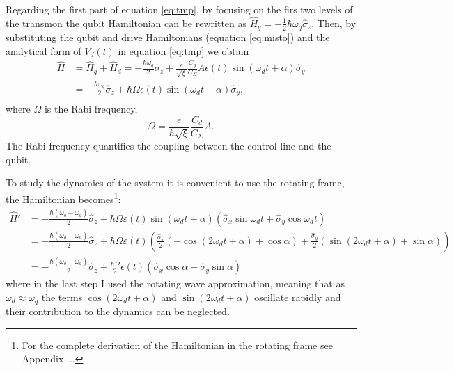 Regarding the first part of equation \ref{eq:tmp}, by focusing on the firs two levels of the transmon the qubit Hamiltonian can be rewritten as $\hat{H}_q = -\frac{1}{2}\hbar\omega_q\hat{\sigma}_z$.
Then, by substituting the qubit and drive Hamiltonians (equation \ref{eq:misto}) and the analytical form of $V_d(t)$ in equation \ref{eq:tmp} we obtain
\begin{align}
    \hat{H} &= \hat{H}_q + \hat{H}_d = -\frac{\hbar \omega_q}{2} \hat{\sigma}_z + \frac{e}{\sqrt{\xi}} \frac{C_g}{C_{\Sigma}} A \epsilon(t) \sin(\omega_d t + \alpha) \hat{\sigma}_y\\
    &= -\frac{\hbar \omega_q}{2} \hat{\sigma}_z + \hbar \Omega \epsilon(t) \sin(\omega_d t + \alpha) \hat{\sigma}_y, \\ \label{eq:interaction_hamiltonian}
\end{align} 
where $\Omega$ is the Rabi frequency, 
\begin{equation}\label{eq:Rabi_frequency}
    \Omega = \frac{e}{\hbar\sqrt{\xi}}\frac{C_d}{C_\Sigma}A.
\end{equation}
The Rabi frequency quantifies the coupling between the control line and the qubit.

To study the dynamics of the system it is convenient to use the rotating frame, the Hamiltonian becomes\footnote{For the complete derivation of the Hamiltonian in the rotating frame see Appendix ...}: %
\begin{align}
    \hat{H}' &= -\frac{\hbar (\omega_q - \omega_d)}{2} \hat{\sigma}_z + \hbar \Omega \varepsilon(t) \sin(\omega_d t + \alpha)\left( \hat{\sigma}_x \sin \omega_d t + \hat{\sigma}_y \cos \omega_d t \right)\\
    &= -\frac{\hbar (\omega_q - \omega_d)}{2} \hat{\sigma}_z + \hbar \Omega \varepsilon(t)\left(\frac{\hat{\sigma}_x}{2} \left( -\cos(2\omega_d t + \alpha) + \cos \alpha \right) + \frac{\hat{\sigma}_y}{2} \left( \sin(2\omega_d t + \alpha) + \sin \alpha \right)\right)\\
    &=  -\frac{\hbar (\omega_q - \omega_d)}{2} \hat{\sigma}_z + \frac{\hbar \Omega}{2} \epsilon(t) \left( \hat{\sigma}_x \cos \alpha + \hat{\sigma}_y \sin \alpha \right)
\end{align}
where in the last step I used the rotating wave approximation, meaning that as $\omega_d\approx\omega_q$ the terms $\cos(2\omega_d t + \alpha)$ and $\sin(2\omega_d t + \alpha)$ oscillate rapidly and their contribution to the dynamics can be neglected.

